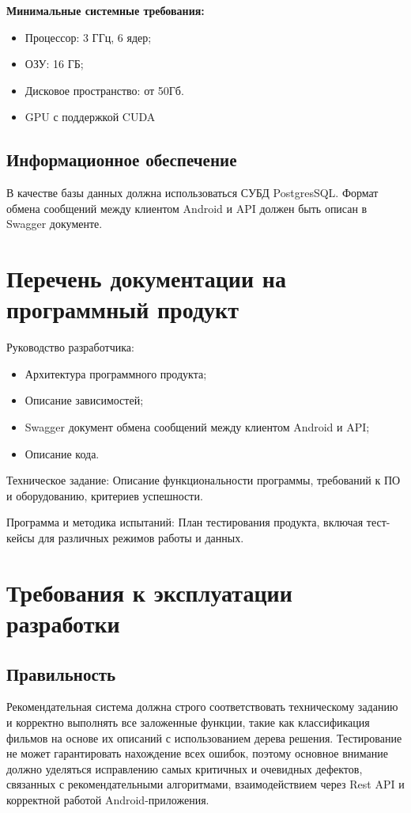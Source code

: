 \textbf{Минимальные системные требования:}

\begin{itemize}
	\item Процессор: 3 ГГц, 6 ядер;
	\item ОЗУ: 16 ГБ;
	\item Дисковое пространство: от 50Гб.
	\item GPU с поддержкой CUDA
\end{itemize}


\subsection{Информационное обеспечение}

В качестве базы данных должна использоваться СУБД PostgresSQL.
Формат обмена сообщений между клиентом Android и API должен быть
описан в Swagger документе.

\section{Перечень документации на программный продукт}

Руководство разработчика:

\begin{itemize}
	\item Архитектура программного продукта;
	\item Описание зависимостей;
	\item Swagger документ обмена сообщений между клиентом Android и API;
	\item Описание кода.
\end{itemize}

Техническое задание:
Описание функциональности программы, требований к ПО
и оборудованию, критериев успешности.

Программа и методика испытаний:
План тестирования продукта,
включая тест-кейсы для различных режимов работы и данных.
\section{Требования к эксплуатации разработки}

\subsection{Правильность}
Рекомендательная система должна строго соответствовать техническому заданию и корректно выполнять все заложенные функции, такие как классификация фильмов на основе их описаний с использованием дерева решения. Тестирование не может гарантировать нахождение всех ошибок, поэтому основное внимание должно уделяться исправлению самых критичных и очевидных дефектов, связанных с рекомендательными алгоритмами, взаимодействием через Rest API и корректной работой Android-приложения.

